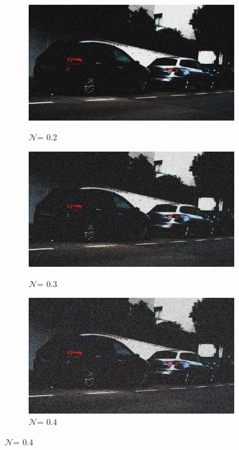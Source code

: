 \documentclass[a4paper]{ctexart}
\begin{document}
\begin{figure}[htbp]
\begin{subfigure}{0.08\textwidth}
				\caption*{$\mathcal{N}$= 0.2}
				\includegraphics[width=\linewidth]{picture/Edge Detection/degrade/RGB_001 Gamma=0.1, Gauss Noise=0.2}
				\label{fig：Gamma=0.1, Gauss Noise = 0.2}
			\end{subfigure}
			\begin{subfigure}{0.08\textwidth}
				\captionsetup{font=scriptsize}
				\caption*{$\mathcal{N}$= 0.3}
				\includegraphics[width=\linewidth]{picture/Edge Detection/degrade/RGB_001 Gamma=0.1, Gauss Noise=0.3}
				\label{fig：Gamma=0.1, Gauss Noise = 0.3}
			\end{subfigure}
			\begin{subfigure}{0.08\textwidth}
				\captionsetup{font=scriptsize}
				\caption*{$\mathcal{N}$= 0.4}
				\includegraphics[width=\linewidth]{picture/Edge Detection/degrade/RGB_001 Gamma=0.1, Gauss Noise=0.4}

\end{subfigure}
\end{figure}
\end{document}
